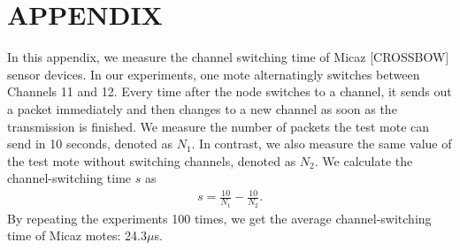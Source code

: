 \appendix
\section*{APPENDIX}
\setcounter{section}{1}
In this appendix, we measure
the channel switching time of Micaz [CROSSBOW] sensor devices.
In our experiments, one mote alternatingly switches between Channels
11 and 12. Every time after the node switches to a channel, it sends
out a packet immediately and then changes to a new channel as soon
as the transmission is finished. We measure the
number of packets the test mote can send in 10 seconds, denoted as
$N_{1}$. In contrast, we also measure the same value of the test
mote without switching channels, denoted as $N_{2}$. We calculate
the channel-switching time $s$ as
\begin{eqnarray}%
s=\frac{10}{N_{1}}-\frac{10}{N_{2}}. \nonumber
\end{eqnarray}%
By repeating the experiments 100 times, we get the average
channel-switching time of Micaz motes: 24.3$\mu$s.


